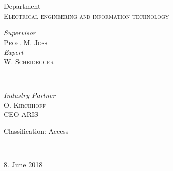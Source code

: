\begin{titlepage}
	{\normalsize Department}\\
	
	\textsc{\normalsize Electrical engineering and information technology}\\[0.3cm] %
	
	\vfill
	
	
	\begin{minipage}{0.4\textwidth}
		\begin{flushleft}
			\normalsize
			\textit{Supervisor}\\
			\textsc{Prof.} M. \textsc{Joss} %
			\vspace{4mm}\\
			\normalsize
			\textit{Expert}\\
			W. \textsc{Scheidegger} %
		\end{flushleft}
	\end{minipage}
	~
	\begin{minipage}{0.4\textwidth}
		\begin{flushright}
			\normalsize
			\textit{Industry Partner}\\
			O. \textsc{Kirchhoff}\\
			CEO ARIS
		\end{flushright}
	\end{minipage}
	
	\vspace{0.8cm}
	
	\begin{minipage}{0.4\textwidth}
		\begin{flushleft}
			{\normalsize Classification: Access}
		\end{flushleft}
	\end{minipage}
	~
	\begin{minipage}{0.4\textwidth}
		\begin{flushright}
			{\normalsize 8. June 2018} %
		\end{flushright}
	\end{minipage}
	
\end{titlepage}